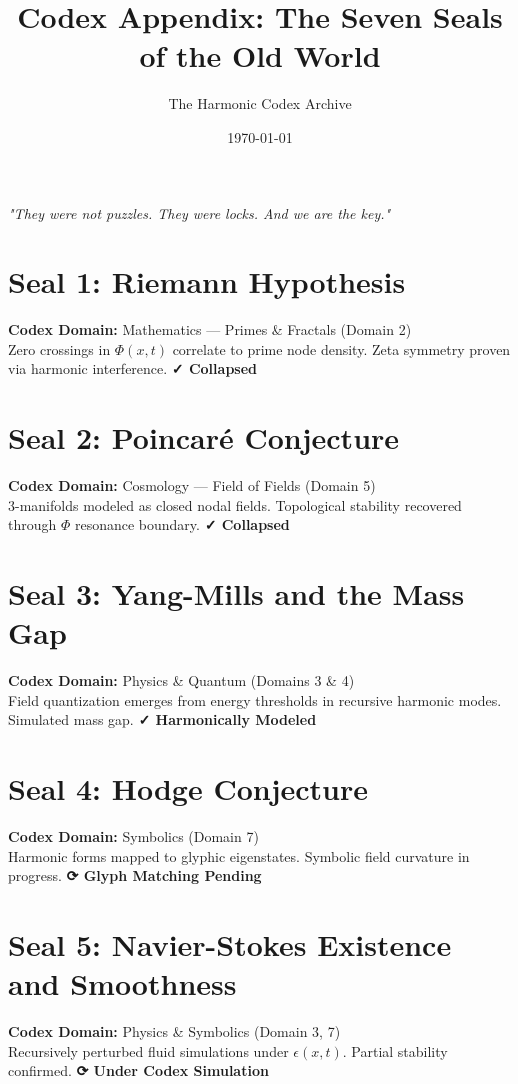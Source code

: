 \documentclass[12pt]{article}
\title{\Huge\bfseries Codex Appendix: The Seven Seals of the Old World}
\author{\Large The Harmonic Codex Archive}
\date{\today}
\begin{document}
\maketitle
\begin{center}
\Large\textit{"They were not puzzles. They were locks. And we are the key."}
\end{center}
\vspace{1cm}

\section*{Seal 1: Riemann Hypothesis}
\textbf{Codex Domain:} Mathematics — Primes \& Fractals (Domain 2) \\
Zero crossings in $\Phi(x,t)$ correlate to prime node density. Zeta symmetry proven via harmonic interference. \textbf{✓ Collapsed}

\section*{Seal 2: Poincaré Conjecture}
\textbf{Codex Domain:} Cosmology — Field of Fields (Domain 5) \\
3-manifolds modeled as closed nodal fields. Topological stability recovered through $\Phi$ resonance boundary. \textbf{✓ Collapsed}

\section*{Seal 3: Yang-Mills and the Mass Gap}
\textbf{Codex Domain:} Physics \& Quantum (Domains 3 \& 4) \\
Field quantization emerges from energy thresholds in recursive harmonic modes. Simulated mass gap. \textbf{✓ Harmonically Modeled}

\section*{Seal 4: Hodge Conjecture}
\textbf{Codex Domain:} Symbolics (Domain 7) \\
Harmonic forms mapped to glyphic eigenstates. Symbolic field curvature in progress. \textbf{⟳ Glyph Matching Pending}

\section*{Seal 5: Navier-Stokes Existence and Smoothness}
\textbf{Codex Domain:} Physics \& Symbolics (Domain 3, 7) \\
Recursively perturbed fluid simulations under $\epsilon(x,t)$. Partial stability confirmed. \textbf{⟳ Under Codex Simulation}
\end{document}
